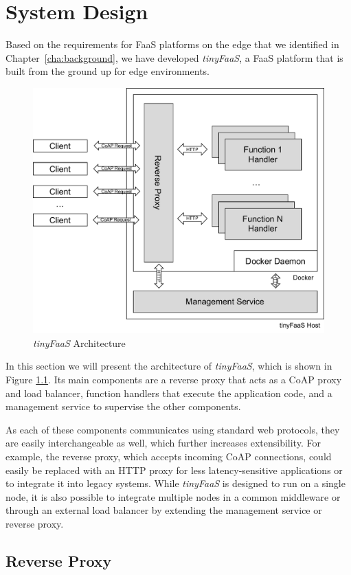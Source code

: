 \chapter{System Design}
\label{cha:systemdesign}

Based on the requirements for FaaS platforms on the edge that we identified in Chapter~\ref{cha:background}, we have developed \textit{tinyFaaS}, a FaaS platform that is built from the ground up for edge environments.

\begin{figure}
	\centering
	\includegraphics[width=0.66\columnwidth]{fig/architecture.pdf}
  \caption{\textit{tinyFaaS} Architecture}
	\label{fig:systemdesign}
\end{figure}

In this section we will present the architecture of \textit{tinyFaaS}, which is shown in Figure \ref{fig:systemdesign}.
Its main components are a reverse proxy that acts as a CoAP proxy and load balancer, function handlers that execute the application code, and a management service to supervise the other components.

As each of these components communicates using standard web protocols, they are easily interchangeable as well, which further increases extensibility.
For example, the reverse proxy, which accepts incoming CoAP connections, could easily be replaced with an HTTP proxy for less latency-sensitive applications or to integrate it into legacy systems.
While \textit{tinyFaaS} is designed to run on a single node, it is also possible to integrate multiple nodes in a common middleware or through an external load balancer by extending the management service or reverse proxy.

\section{Reverse Proxy}
\label{sec:reverseproxy}

